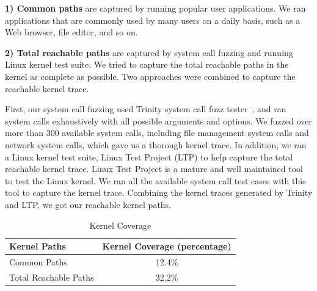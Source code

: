 
\textbf{1) Common paths} are captured by running popular user applications.
We ran applications that are commonly used by many users on a daily basis, such as a Web browser, 
file editor, and so on.  

\textbf{2) Total reachable paths} are captured by system call fuzzing and running Linux kernel test suite. 
We tried to capture the total reachable paths in the kernel as complete as possible. 
Two approaches were combined to capture the reachable kernel trace. 

First, our system call fuzzing used Trinity system call fuzz tester~\cite{Trinity}, 
and ran system calls exhaustively with all possible 
arguments and options. We fuzzed over more than 300 available system calls, including
file management system calls and network system calls, which gave us a thorough kernel trace. 
In addition, we ran a Linux kernel test suite, Linux Test Project (LTP) \cite{LTP} 
to help capture the total reachable kernel trace. 
Linux Test Project is a mature and well maintained tool to test the Linux kernel. We ran all the available system call 
test cases with this tool to capture the kernel trace. 
Combining the kernel traces generated by Trinity and LTP, we got our reachable kernel paths.


\begin{table}%
\centering
\scriptsize
\begin{tabular}{|l|c|}
  \hline
  \textbf{Kernel Paths} & \textbf{Kernel Coverage (percentage)} \\
  \hline \hline
  Common Paths & 12.4\% \\
  \hline
  Total Reachable Paths & 32.2\% \\
  \hline
\end{tabular}
\caption {Kernel Coverage}
\label{table:kernel_coverage}
\end{table}


